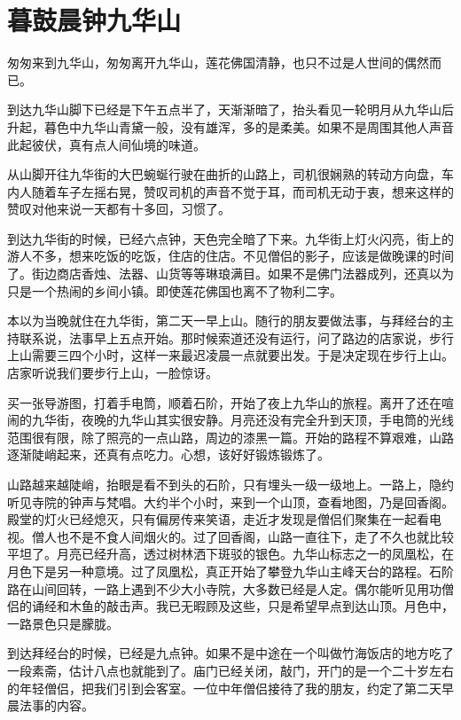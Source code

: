 \chapter{暮鼓晨钟九华山}

匆匆来到九华山，匆匆离开九华山，莲花佛国清静，也只不过是人世间的偶然而已。

到达九华山脚下已经是下午五点半了，天渐渐暗了，抬头看见一轮明月从九华山后升起，暮色中九华山青黛一般，没有雄浑，多的是柔美。如果不是周围其他人声音此起彼伏，真有点人间仙境的味道。

从山脚开往九华街的大巴蜿蜒行驶在曲折的山路上，司机很娴熟的转动方向盘，车内人随着车子左摇右晃，赞叹司机的声音不觉于耳，而司机无动于衷，想来这样的赞叹对他来说一天都有十多回，习惯了。

到达九华街的时候，已经六点钟，天色完全暗了下来。九华街上灯火闪亮，街上的游人不多，想来吃饭的吃饭，住店的住店。不见僧侣的影子，应该是做晚课的时间了。街边商店香烛、法器、山货等等琳琅满目。如果不是佛门法器成列，还真以为只是一个热闹的乡间小镇。即使莲花佛国也离不了物利二字。

本以为当晚就住在九华街，第二天一早上山。随行的朋友要做法事，与拜经台的主持联系说，法事早上五点开始。那时候索道还没有运行，问了路边的店家说，步行上山需要三四个小时，这样一来最迟凌晨一点就要出发。于是决定现在步行上山。店家听说我们要步行上山，一脸惊讶。

买一张导游图，打着手电筒，顺着石阶，开始了夜上九华山的旅程。离开了还在喧闹的九华街，夜晚的九华山其实很安静。月亮还没有完全升到天顶，手电筒的光线范围很有限，除了照亮的一点山路，周边的漆黑一篇。开始的路程不算艰难，山路逐渐陡峭起来，还真有点吃力。心想，该好好锻炼锻炼了。

山路越来越陡峭，抬眼是看不到头的石阶，只有埋头一级一级地上。一路上，隐约听见寺院的钟声与梵唱。大约半个小时，来到一个山顶，查看地图，乃是回香阁。殿堂的灯火已经熄灭，只有偏房传来笑语，走近才发现是僧侣们聚集在一起看电视。僧人也不是不食人间烟火的。过了回香阁，山路一直往下，走了不久也就比较平坦了。月亮已经升高，透过树林洒下斑驳的银色。九华山标志之一的凤凰松，在月色下是另一种意境。过了凤凰松，真正开始了攀登九华山主峰天台的路程。石阶路在山间回转，一路上遇到不少大小寺院，大多数已经是人定。偶尔能听见用功僧侣的诵经和木鱼的敲击声。我已无暇顾及这些，只是希望早点到达山顶。月色中，一路景色只是朦胧。

到达拜经台的时候，已经是九点钟。如果不是中途在一个叫做竹海饭店的地方吃了一段素斋，估计八点也就能到了。庙门已经关闭，敲门，开门的是一个二十岁左右的年轻僧侣，把我们引到会客室。一位中年僧侣接待了我的朋友，约定了第二天早晨法事的内容。


